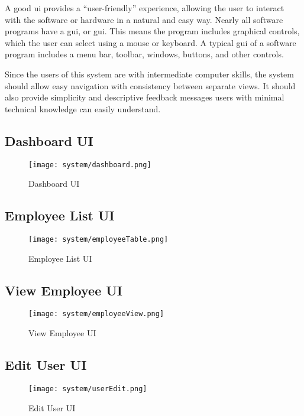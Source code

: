 \documentclass[12pt]{report}
\begin{document}
A good \acrshort{ui} provides a ``user-friendly'' experience, allowing the user to interact with the software or hardware in a natural and easy way. Nearly all software programs have a \acrlong{gui}, or \acrshort{gui}. This means the program includes graphical controls, which the user can select using a mouse or
keyboard. A typical \acrshort{gui} of a software program includes a menu bar, toolbar, windows, buttons, and other controls.

Since the users of this system are with intermediate computer skills, the system should allow easy navigation with consistency between separate views. It should also provide simplicity and descriptive feedback messages users with minimal technical knowledge can easily understand.

\subsection{Dashboard UI}
\begin{figure}[H]
	\centering
	\texttt{[image: system/dashboard.png]}
	\caption{Dashboard UI}
\end{figure}

\subsection{Employee List UI}
\begin{figure}[H]
	\centering
	\texttt{[image: system/employeeTable.png]}
	\caption{Employee List UI}
\end{figure}

\subsection{View Employee UI}
\begin{figure}[H]
	\centering
	\texttt{[image: system/employeeView.png]}
	\caption{View Employee UI}
\end{figure}

\subsection{Edit User UI}
\begin{figure}[H]
	\centering
	\texttt{[image: system/userEdit.png]}
	\caption{Edit User UI}
\end{figure}
\end{document}
